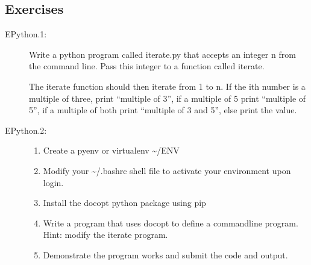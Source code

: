 \subsection{Exercises}\label{exercises}

\begin{description}
\item[EPython.1:]
Write a python program called iterate.py that accepts an integer n from
the command line. Pass this integer to a function called iterate.

The iterate function should then iterate from 1 to n. If the ith number
is a multiple of three, print ``multiple of 3'', if a multiple of 5
print ``multiple of 5'', if a multiple of both print ``multiple of 3 and
5'', else print the value.
\item[EPython.2:]
\begin{enumerate}

\item
  Create a pyenv or virtualenv \textasciitilde{}/ENV
\item
  Modify your \textasciitilde{}/.bashrc shell file to activate your
  environment upon login.
\item
  Install the docopt python package using pip
\item
  Write a program that uses docopt to define a commandline program.
  Hint: modify the iterate program.
\item
  Demonstrate the program works and submit the code and output.
\end{enumerate}
\end{description}
